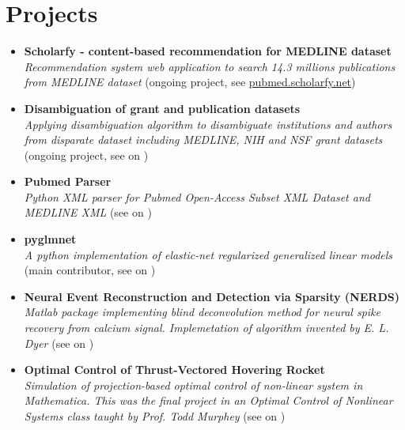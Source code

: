 \section{\sc Projects}
\begin{itemize}[leftmargin=0cm, label={}]

\item {\bf Scholarfy - content-based recommendation for MEDLINE dataset}\\
{\em Recommendation system web application to search 14.3 millions publications from MEDLINE dataset} (ongoing project, see \href{http://pubmed.scholarfy.net}{pubmed.scholarfy.net})

\item {\bf Disambiguation of grant and publication datasets}\\
{\em Applying disambiguation algorithm to disambiguate institutions and authors from disparate dataset including MEDLINE, NIH and NSF grant datasets} (ongoing project, see on \href{https://github.com/titipata/grant_database}{\faGithubAlt})

\item {\bf Pubmed Parser}\\
{\em Python XML parser for Pubmed Open-Access Subset XML Dataset and MEDLINE XML} (see on \href{https://github.com/titipata/pubmed_parser}{\faGithubAlt})

\item {\bf pyglmnet}\\
{\em A python implementation of elastic-net regularized generalized linear models} (main contributor, see on \href{https://github.com/pavanramkumar/pyglmnet}{\faGithubAlt})

\item {\bf Neural Event Reconstruction and Detection via Sparsity (NERDS)}\\
{\em Matlab package implementing blind deconvolution method for neural spike recovery from calcium signal. Implemetation of algorithm invented by E. L. Dyer} (see on \href{https://github.com/KordingLab/nerds}{\faGithubAlt})

\item {\bf Optimal Control of Thrust-Vectored Hovering Rocket}\\
{\em Simulation of projection-based optimal control of non-linear system in Mathematica. This was the final project in an  Optimal Control of Nonlinear Systems class taught by Prof. Todd Murphey} (see on \href{https://github.com/titipata/me454_nonlinear_optimal_control}{\faGithubAlt})


\end{itemize}
